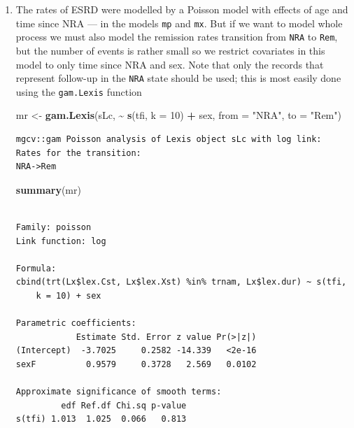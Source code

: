 \documentclass[
]{book}
\newenvironment{Shaded}{\begin{snugshade}}{\end{snugshade}}
\newcommand{\AttributeTok}[1]{\textcolor[rgb]{0.13,0.29,0.53}{#1}}
\newcommand{\DecValTok}[1]{\textcolor[rgb]{0.00,0.00,0.81}{#1}}
\newcommand{\FunctionTok}[1]{\textcolor[rgb]{0.13,0.29,0.53}{\textbf{#1}}}
\newcommand{\NormalTok}[1]{#1}
\newcommand{\OtherTok}[1]{\textcolor[rgb]{0.56,0.35,0.01}{#1}}
\newcommand{\SpecialCharTok}[1]{\textcolor[rgb]{0.81,0.36,0.00}{\textbf{#1}}}
\newcommand{\StringTok}[1]{\textcolor[rgb]{0.31,0.60,0.02}{#1}}
\theoremstyle{definition}
\theoremstyle{definition}
\theoremstyle{definition}
\theoremstyle{definition}
\theoremstyle{remark}
\begin{document}
\begin{enumerate}
\def\labelenumi{\arabic{enumi}.}
\setcounter{enumi}{16}
\item
  The rates of ESRD were modelled by a Poisson model with
  effects of age and time since NRA --- in the models \texttt{mp}
  and \texttt{mx}. But if we want to model whole process we must
  also model the remission rates transition from \texttt{NRA} to
  \texttt{Rem}, but the number of events is rather small so we restrict
  covariates in this model to only time since NRA and sex. Note
  that only the records that represent follow-up in the \texttt{NRA}
  state should be used; this is most easily done using the
  \texttt{gam.Lexis} function

\begin{Shaded}
\begin{Highlighting}[]
\NormalTok{mr }\OtherTok{\textless{}{-}} \FunctionTok{gam.Lexis}\NormalTok{(sLc, }\SpecialCharTok{\textasciitilde{}} \FunctionTok{s}\NormalTok{(tfi, }\AttributeTok{k =} \DecValTok{10}\NormalTok{) }\SpecialCharTok{+}\NormalTok{ sex,}
                     \AttributeTok{from =} \StringTok{"NRA"}\NormalTok{,}
                       \AttributeTok{to =} \StringTok{"Rem"}\NormalTok{)}
\end{Highlighting}
\end{Shaded}

\begin{verbatim}
mgcv::gam Poisson analysis of Lexis object sLc with log link:
Rates for the transition:
NRA->Rem
\end{verbatim}

\begin{Shaded}
\begin{Highlighting}[]
\FunctionTok{summary}\NormalTok{(mr)}
\end{Highlighting}
\end{Shaded}

\begin{verbatim}

Family: poisson 
Link function: log 

Formula:
cbind(trt(Lx$lex.Cst, Lx$lex.Xst) %in% trnam, Lx$lex.dur) ~ s(tfi, 
    k = 10) + sex

Parametric coefficients:
            Estimate Std. Error z value Pr(>|z|)
(Intercept)  -3.7025     0.2582 -14.339   <2e-16
sexF          0.9579     0.3728   2.569   0.0102

Approximate significance of smooth terms:
         edf Ref.df Chi.sq p-value
s(tfi) 1.013  1.025  0.066   0.813


\end{verbatim}
\end{enumerate}
\end{document}
